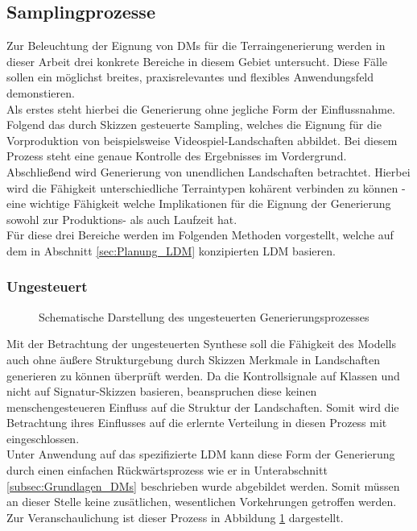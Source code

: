 \subsection {Samplingprozesse}

Zur Beleuchtung der Eignung von DMs für die Terraingenerierung werden in dieser Arbeit drei konkrete Bereiche in diesem Gebiet untersucht. Diese Fälle sollen ein möglichst breites, praxisrelevantes und flexibles Anwendungsfeld demonstieren.\\
Als erstes steht hierbei die Generierung ohne jegliche Form der Einflussnahme. \\
Folgend das durch Skizzen gesteuerte Sampling, welches die Eignung für die Vorproduktion von beispielsweise Videospiel-Landschaften abbildet. Bei diesem Prozess steht eine genaue Kontrolle des Ergebnisses im Vordergrund. \\
Abschließend wird Generierung von unendlichen Landschaften betrachtet. Hierbei wird die Fähigkeit unterschiedliche Terraintypen kohärent verbinden zu können - eine wichtige Fähigkeit welche Implikationen für die Eignung der Generierung sowohl zur Produktions- als auch Laufzeit hat. \\
Für diese drei Bereiche werden im Folgenden Methoden vorgestellt, welche auf dem in Abschnitt \ref{sec:Planung_LDM} konzipierten \ac{LDM} basieren. 


\subsubsection {Ungesteuert}

\begin{figure}[htbp]
    \centering
    \caption{Schematische Darstellung des ungesteuerten Generierungsprozesses}
    \label{fig:unguided_method}
\end{figure}
Mit der Betrachtung der ungesteuerten Synthese soll die Fähigkeit des Modells auch ohne äußere Strukturgebung durch Skizzen Merkmale in Landschaften generieren zu können überprüft werden. Da die Kontrollsignale auf Klassen und nicht auf Signatur-Skizzen basieren, beanspruchen diese keinen menschengesteueren Einfluss auf die Struktur der Landschaften. Somit wird die Betrachtung ihres Einflusses auf die erlernte Verteilung in diesen Prozess mit eingeschlossen. \\
Unter Anwendung auf das spezifizierte \ac{LDM} kann diese Form der Generierung durch einen einfachen Rückwärtsprozess wie er in Unterabschnitt \ref{subsec:Grundlagen_DMs} beschrieben wurde abgebildet werden. Somit müssen an dieser Stelle keine zusätlichen, wesentlichen Vorkehrungen getroffen werden. Zur Veranschaulichung ist dieser Prozess in Abbildung \ref{fig:unguided_method} dargestellt.

